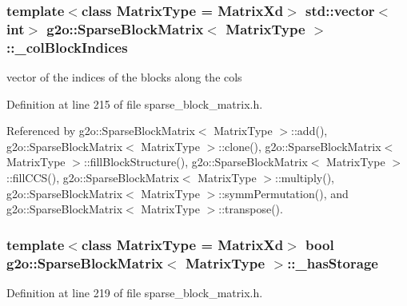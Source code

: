 \subsubsection[{\texorpdfstring{\+\_\+col\+Block\+Indices}{_colBlockIndices}}]{\setlength{\rightskip}{0pt plus 5cm}template$<$class Matrix\+Type = Matrix\+Xd$>$ std\+::vector$<$int$>$ {\bf g2o\+::\+Sparse\+Block\+Matrix}$<$ Matrix\+Type $>$\+::\+\_\+col\+Block\+Indices\hspace{0.3cm}{\ttfamily [protected]}}\hypertarget{classg2o_1_1SparseBlockMatrix_aca008740c37d2d00b90f696ab19abb59}{}\label{classg2o_1_1SparseBlockMatrix_aca008740c37d2d00b90f696ab19abb59}
vector of the indices of the blocks along the cols 

Definition at line 215 of file sparse\+\_\+block\+\_\+matrix.\+h.



Referenced by g2o\+::\+Sparse\+Block\+Matrix$<$ Matrix\+Type $>$\+::add(), g2o\+::\+Sparse\+Block\+Matrix$<$ Matrix\+Type $>$\+::clone(), g2o\+::\+Sparse\+Block\+Matrix$<$ Matrix\+Type $>$\+::fill\+Block\+Structure(), g2o\+::\+Sparse\+Block\+Matrix$<$ Matrix\+Type $>$\+::fill\+C\+C\+S(), g2o\+::\+Sparse\+Block\+Matrix$<$ Matrix\+Type $>$\+::multiply(), g2o\+::\+Sparse\+Block\+Matrix$<$ Matrix\+Type $>$\+::symm\+Permutation(), and g2o\+::\+Sparse\+Block\+Matrix$<$ Matrix\+Type $>$\+::transpose().

\subsubsection[{\texorpdfstring{\+\_\+has\+Storage}{_hasStorage}}]{\setlength{\rightskip}{0pt plus 5cm}template$<$class Matrix\+Type = Matrix\+Xd$>$ bool {\bf g2o\+::\+Sparse\+Block\+Matrix}$<$ Matrix\+Type $>$\+::\+\_\+has\+Storage\hspace{0.3cm}{\ttfamily [protected]}}\hypertarget{classg2o_1_1SparseBlockMatrix_ae3f063a5efc2708b41806ac361fd3ca6}{}\label{classg2o_1_1SparseBlockMatrix_ae3f063a5efc2708b41806ac361fd3ca6}


Definition at line 219 of file sparse\+\_\+block\+\_\+matrix.\+h.



